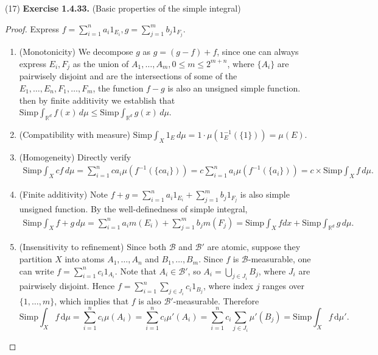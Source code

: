 \documentclass[a4paper]{article}
\begin{document}
(17) {\bfseries Exercise 1.4.33.} (Basic properties of the simple integral) \begin{proof}
    Express $f = \sum_{i = 1}^n a_i1_{E_i}, g = \sum_{j = 1}^m b_j1_{F_j}$.
\begin{enumerate}[label = (\roman*)]
    \item (Monotonicity) We decompose $g$ as $g = (g - f) + f$, since one can always express $E_i, F_j$ as the union of 
    $A_1, \dots, A_m, 0 \leq m \leq 2^{m + n}$, where $\{A_i\}$ are pairwisely disjoint and are the intersections of some 
    of the $E_1, \dots, E_n, F_1, \dots, F_m$, the function $f - g$ is also an unsigned simple function. 
    then by finite additivity we establish that $\mathrm{Simp}\int_{\mathbb{R}^d} f(x)\,d\mu \leq \mathrm{Simp}\int_{\mathbb{R}^d} g(x)\,d\mu$.
    \item (Compatibility with measure) $\mathrm{Simp} \int_X 1_E \,d\mu = 1\cdot \mu(1_E^{-1}(\{1\})) = \mu(E)$.
    \item (Homogeneity) Directly verify\begin{align*}
    \mathrm{Simp}\int_X cf\,d\mu = \sum_{i = 1}^n ca_i\mu(f^{-1}(\{ca_i\})) = c\sum_{i = 1}^n a_i\mu(f^{-1}(\{a_i\}))
    = c\times \mathrm{Simp}\int_X f\,d\mu.
    \end{align*}
    \item (Finite additivity) Note $f + g = \sum_{i = 1}^n a_i1_{E_i} + \sum_{j = 1}^m b_j1_{F_j}$ is also simple unsigned function. By the 
    well-definedness of simple integral, \begin{align*}
    \mathrm{Simp}\int_X f + g\,d\mu = \sum_{i = 1}^n a_i m(E_i) + \sum_{j = 1}^m b_jm(F_j) =
    \mathrm{Simp}\int_X f dx + \mathrm{Simp}\int_{\mathbb{R}^d} g\,d\mu.
    \end{align*}
    \item (Insensitivity to refinement) Since both $\mathcal{B}$ and $\mathcal{B}'$ are atomic, suppose they partition $X$ into atoms $A_1, \dots, A_n$ and
    $B_1, \dots, B_m$. Since $f$ is $\mathcal{B}$-measurable, one can write $f = \sum_{i = 1}^n c_i1_{A_i}$. Note that
    $A_i \in \mathcal{B}'$, so $A_i = \bigcup_{j \in J_i} B_j$, where $J_i$ are pairwisely disjoint. Hence 
    $f = \sum_{i = 1}^n\sum_{j \in J_i} c_i1_{B_j}$, where index $j$ ranges over $\{1, \dots, m\}$, which implies that
    $f$ is also $\mathcal{B}'$-measurable. Therefore$$
    \mathrm{Simp}\int_X f\, \mathrm{d}\mu = \sum_{i = 1}^n c_i\mu(A_i) = \sum_{i = 1}^n c_i\mu'(A_i) = 
    \sum_{i = 1}^n c_i\sum_{j \in J_i} \mu'(B_j) = \mathrm{Simp}\int_X f\, \mathrm{d}\mu'.
$$
\end{enumerate}
\end{proof}
\end{document}
